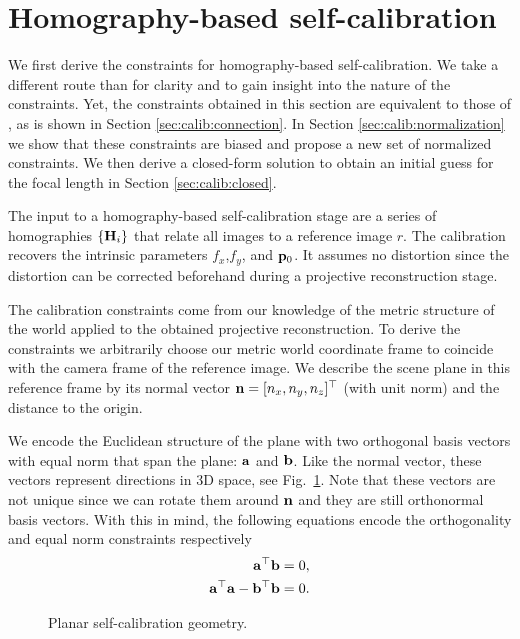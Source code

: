 \documentclass[10pt,twocolumn,letterpaper]{article}
\begin{document}
\section{Homography-based self-calibration}
We first derive the constraints for homography-based self-calibration. We take a different route than \cite{bocquillon2006} for clarity and to gain insight into the nature of the constraints. Yet, the constraints obtained in this section are equivalent to those of \cite{bocquillon2006}, as is shown in Section \ref{sec:calib:connection}. In Section \ref{sec:calib:normalization} we show that these constraints are biased and propose a new set of normalized constraints. We then derive a closed-form solution to obtain an initial guess for the focal length in Section \ref{sec:calib:closed}.

The input to a homography-based self-calibration stage are a series of homographies $\lbrace \mathbf{H}_i \rbrace$ that relate all images to a reference image $r$. The calibration recovers the intrinsic parameters $f_x$,$f_y$, and $\mathbf{p}_0$. It assumes no distortion since the distortion can be corrected beforehand during a projective reconstruction stage.

The calibration constraints come from our knowledge of the metric structure of the world applied to the obtained projective reconstruction. To derive the constraints we arbitrarily choose our metric world coordinate frame to coincide with the camera frame of the reference image. We describe the scene plane in this reference frame by its normal vector $\mathbf{n}=[n_x,n_y,n_z]^\top$ (with unit norm) and the distance to the origin.

We encode the Euclidean structure of the plane with two orthogonal basis vectors with equal norm that span the plane: $\mathbf{a}$ and $\mathbf{b}$. Like the normal vector, these vectors represent directions in 3D space, see Fig.~\ref{fig:planar_structure}. Note that these vectors are not unique since we can rotate them around $\mathbf{n}$ and they are still orthonormal basis vectors. With this in mind, the following equations encode the orthogonality and equal norm constraints respectively
\begin{align}
\mathbf{a}^\top \mathbf{b} = 0, \label{eq:ortho_constraint_ref} \\
\mathbf{a}^\top \mathbf{a} - \mathbf{b}^\top \mathbf{b} = 0. \label{eq:norm_constraint_ref}
\end{align}

\begin{figure}

\caption{Planar self-calibration geometry.}
\label{fig:planar_structure}
\end{figure}
\end{document}

